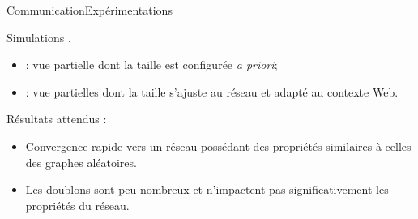 \begin{frame}{Communication}{Expérimentations}

  Simulations \PEERSIM.

  \vspace{0.5cm}

  \begin{itemize}
  \item \CYCLON : vue partielle dont la taille est configurée \textit{a priori};
  \item \SPRAY : vue partielles dont la taille s'ajuste au réseau et adapté au
    contexte Web.
  \end{itemize}


  
  \vspace{0.5cm}


  Résultats attendus :
  \begin{itemize}
  \item Convergence rapide vers un réseau possédant des propriétés similaires à
    celles des graphes aléatoires.
  \item Les doublons sont peu nombreux et n'impactent pas significativement les
    propriétés du réseau.
  \end{itemize}

\end{frame}

